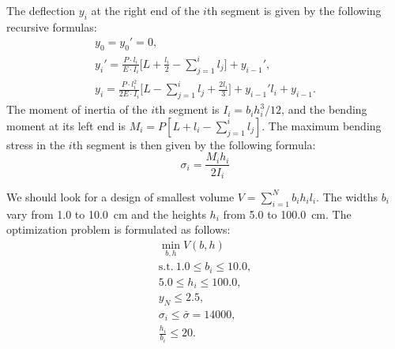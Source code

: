 \documentclass[a4paper]{llncs}
\begin{document}
The deflection $y_i$ at the right end of the $i$th segment is given by the
following recursive formulas:
\begin{displaymath}
  \begin{array}{c}
    y_0=y_0'=0, \\
    y_i'=\frac{P\cdot l_i}{E\cdot I_i}\Big[ L+\frac{l_i}{2}-\sum\limits_{j=1}^i l_j\Big]+y_{i-1}', \\
    y_i=\frac{P\cdot l_i^2}{2E\cdot I_i}\Big[L-\sum\limits_{j=1}^i l_j + \frac{2l_i}{3}\Big]+y_{i-1}'l_i+y_{i-1}.
  \end{array}
\end{displaymath}
The moment of inertia of the $i$th segment is $I_i={b_i h_i^3}/{12}$, and the
bending moment at its left end is $M_i=P[L+l_i- \sum_{j=1}^{i}  l_j ]$. The
maximum bending stress in the $i$th segment is then given by the following
formula:
\begin{displaymath}
  \sigma_i=\frac{M_i h_i}{2I_i}
\end{displaymath}

We should look for a design of smallest volume $V = \sum_{i=1}^N b_i h_i l_i$.
The widths $b_i$ vary from 1.0 to 10.0~cm and the heights $h_i$ from 5.0 to
100.0~cm. The optimization problem is formulated as follows:
\begin{displaymath}
  \begin{array}{c}
    \min\limits_{ b,  h}V( b,  h) \\
    \text{s.t.}\ 1.0\le b_i \le 10.0, \\
    5.0 \le h_i \le 100.0, \\
    y_N\le 2.5, \\
    \sigma_i \le \bar{\sigma}=14000, \\
    \frac{h_i}{b_i}\le 20.
  \end{array}
\end{displaymath}
\end{document}
